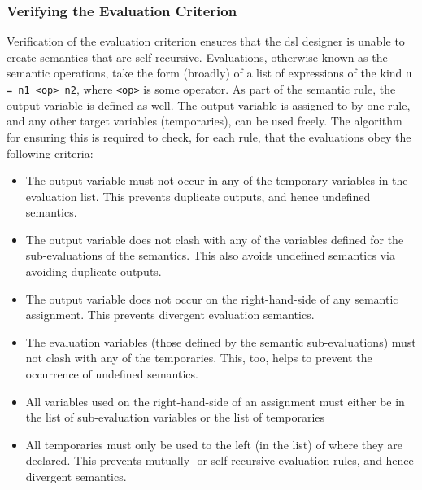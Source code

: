 
\subsubsection{Verifying the Evaluation Criterion} %
\label{ssub:verifying_the_evaluation_criterion}
Verification of the evaluation criterion ensures that the \gls{dsl} designer is unable to create semantics that are self-recursive. 
Evaluations, otherwise known as the semantic operations, take the form (broadly) of a list of expressions of the kind \texttt{n = n1 <op> n2}, where \texttt{<op>} is some operator.
As part of the semantic rule, the output variable is defined as well. 
The output variable is assigned to by one rule, and any other target variables (temporaries), can be used freely.
The algorithm for ensuring this is required to check, for each rule, that the evaluations obey the following criteria:
\begin{itemize}
    \item The output variable must not occur in any of the temporary variables in the evaluation list.
    This prevents duplicate outputs, and hence undefined semantics.
    \item The output variable does not clash with any of the variables defined for the sub-evaluations of the semantics.
    This also avoids undefined semantics via avoiding duplicate outputs. 
    \item The output variable does not occur on the right-hand-side of any semantic assignment.
    This prevents divergent evaluation semantics.
    \item The evaluation variables (those defined by the semantic sub-evaluations) must not clash with any of the temporaries.
    This, too, helps to prevent the occurrence of undefined semantics.
    \item All variables used on the right-hand-side of an assignment must either be in the list of sub-evaluation variables or the list of temporaries 
    \item All temporaries must only be used to the left (in the list) of where they are declared.
    This prevents mutually- or self-recursive evaluation rules, and hence divergent semantics.
\end{itemize}

